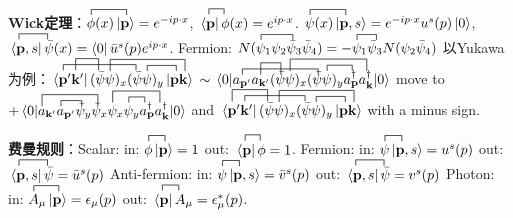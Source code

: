 \documentclass[11pt]{article}
\newcommand{\vbp}{\vb{p}}
\newcommand{\vbk}{\vb{k}}
\begin{document}
{\bf Wick定理}：$\contraction{}{\phi}{(x)}{\ket{\vbp}}\phi(x)\ket{\vbp}=e^{-ip\cdot x}$, $\contraction{}{\bra{\vbp}}{}{\phi}\bra{\vbp}\phi(x)=e^{ip\cdot x}$. $\contraction{}{\psi}{(x)}{\ket{\vbp}}\psi(x)\ket{\vbp,s}=e^{-ip\cdot x}u^s(p)\ket{0}$, $\contraction{}{\bra{\vbp}}{,s}{\bar\psi}\bra{\vbp,s}{\bar}\psi(x)=\bra{0}\bar u^s(p)e^{ip\cdot x}$.
Fermion: $N(\contraction{}{\psi}{_1\psi_2}{\bar\psi}\psi_1\psi_2\bar\psi_3\bar\psi_4)=-\contraction{}{\psi}{_1}{\bar\psi_3}\psi_1\bar\psi_3N(\psi_2\bar\psi_4) $
以Yukawa为例：$\contraction{}{\bra{\vbp'}}{\vbk'(\bar\psi\psi)_x(}{\bar\psi}\contraction[2ex]{\vbk'}{\bra{\vbk'}}{(}{\bar\psi}\contraction[2ex]{\bra{\vbp'\vbk'}(\bar\psi}{\psi}{)_x(\bar\psi\psi)_y\vbp}{\ket{\vbk}}\contraction{\bra{\vbp'\vbk'}(\bar\psi\psi)_x(\bar\psi}{\psi}{)_y}{\ket{\vbp}}  \bra{\vbp'\vbk'}(\bar\psi\psi)_x(\bar\psi\psi)_y\ket{\vbp\vbk}$
$\sim\mel{0}{\contraction{}{a_{\vbp'}}{a_{\vbk'}(\bar\psi\psi)_x(}{\bar\psi}\contraction[2ex]{a_{\vbk'}}{a_{\vbk'}}{(}{\bar\psi}\contraction[2ex]{a_{\vbp'}a_{\vbk'}(\bar\psi}{\psi}{)_x(\bar\psi\psi)_ya_{\vbk}^{\dagger}}{a_{\vbk}^{\dagger}}\contraction{a_{\vbk'}a_{\vbp'}(\bar\psi\psi)_x(\bar\psi}{\psi}{)_y}{a_{\vbp}^{\dagger}}  a_{\vbp'}a_{\vbk'}(\bar\psi\psi)_x(\bar\psi\psi)_ya_{\vbp}^{\dagger}a_{\vbk}^{\dagger}}{0}$
move to $+\mel{0}{\contraction[2ex]{}{a}{_{\vbp'}a_{\vbp'}\bar\psi_x}{\bar\psi}\contraction{a_{\vbp'}}{a}{_{\vbp'}}{\bar\psi}\contraction[2ex]{a_{\vbk'}a_{\vbp'}\bar\psi_y\bar\psi_x}{\psi}{_x\psi_ya_{\vbp}^{\dagger}}{a}\contraction{a_{\vbk'}a_{\vbp'}\bar\psi_y\bar\psi_x\psi_x}{\psi}{_y}{a}  a_{\vbk'}a_{\vbp'}\bar\psi_y\bar\psi_x \psi_x\psi_y a_{\vbp}^{\dagger}a_{\vbk}^{\dagger}}{0}$
and $\contraction{\vbk'}{\bra{\vbp'}}{(\bar\psi\psi)_x(}{\bar\psi}\contraction[2ex]{}{\bra{\vbk'}}{\vbk'(}{\bar\psi}\contraction[2ex]{\bra{\vbp'\vbk'}(\bar\psi}{\psi}{)_x(\bar\psi\psi)_y\vbp}{\ket{\vbk}}\contraction{\bra{\vbp'\vbk'}(\bar\psi\psi)_x(\bar\psi}{\psi}{)_y}{\ket{\vbp}}  \bra{\vbp'\vbk'}(\bar\psi\psi)_x(\bar\psi\psi)_y\ket{\vbp\vbk}$ with a minus sign.

{\bf 费曼规则}：Scalar: in: $\contraction{}{\phi}{}{\ket{\vbp}}\phi\ket{\vbp}=1$ out: $\contraction{}{\bra{\vbp}}{}{\phi}\bra{\vbp}\phi=1$.
Fermion: in: $\contraction{}{\psi}{}{\ket{\vbp}}\psi\ket{\vbp,s}=u^s(p)$ out: $\contraction{}{\bra{\vbp}}{,s}{\bar\psi}\bra{\vbp,s}{\bar}\psi=\bar u^s(p)$
Anti-fermion: in: $\contraction{}{\psi}{}{\ket{\vbp}}\psi\ket{\vbp,s}=\bar v^s(p)$ out: $\contraction{}{\bra{\vbp}}{,s}{\bar\psi}\bra{\vbp,s}{\bar}\psi=v^s(p)$
Photon: in: $\contraction{}{A}{_{\mu}}{\ket{\vbp}}A_{\mu}\ket{\vbp}=\epsilon_{\mu}(p)$ out: $\contraction{}{\bra{\vbp}}{}{A}\bra{\vbp}A_{\mu}=\epsilon^*_{\mu}(p)$.
\end{document}
